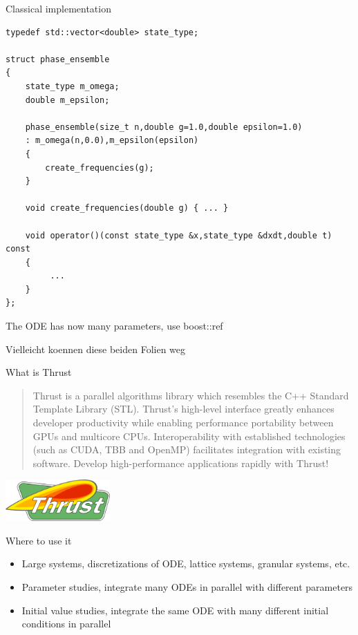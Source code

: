 \begin{frame}[fragile]

Classical implementation

\begin{lstlisting}
typedef std::vector<double> state_type;

struct phase_ensemble
{
    state_type m_omega;
    double m_epsilon;

    phase_ensemble(size_t n,double g=1.0,double epsilon=1.0)
    : m_omega(n,0.0),m_epsilon(epsilon)
    {
        create_frequencies(g);
    }

    void create_frequencies(double g) { ... }

    void operator()(const state_type &x,state_type &dxdt,double t) const
    {
         ...
    }
};
\end{lstlisting}

The ODE has now many parameters, use boost::ref

Vielleicht koennen diese beiden Folien weg

\end{frame}



\begin{frame}[fragile]


What is Thrust
\begin{quotation}
Thrust is a parallel algorithms library which resembles the C++ Standard Template Library (STL). Thrust's high-level interface greatly enhances developer productivity while enabling performance portability between GPUs and multicore CPUs. Interoperability with established technologies (such as CUDA, TBB and OpenMP) facilitates integration with existing software. Develop high-performance applications rapidly with Thrust!
\end{quotation}


\includegraphics[draft=false,width=0.3\textwidth]{thrust_logo.png}
 

\end{frame}


\begin{frame}[fragile]
 

Where to use it
\begin{itemize}
 \item Large systems, discretizations of ODE, lattice systems, granular systems, etc.
 \item Parameter studies, integrate many ODEs in parallel with different parameters
 \item Initial value studies, integrate the same ODE with many different initial conditions in parallel
\end{itemize}


\end{frame}



